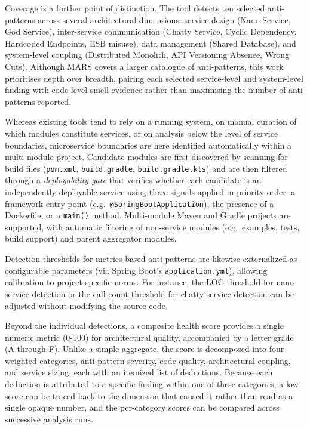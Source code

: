 Coverage is a further point of distinction. The tool detects ten selected anti-patterns across several architectural dimensions: service design (Nano Service, God Service), inter-service communication (Chatty Service, Cyclic Dependency, Hardcoded Endpoints, ESB misuse), data management (Shared Database), and system-level coupling (Distributed Monolith, API Versioning Absence, Wrong Cuts). Although MARS covers a larger catalogue of anti-patterns, this work prioritises depth over breadth, pairing each selected service-level and system-level finding with code-level smell evidence rather than maximising the number of anti-patterns reported.

Whereas existing tools tend to rely on a running system, on manual curation of which modules constitute services, or on analysis below the level of service boundaries, microservice boundaries are here identified automatically within a multi-module project. Candidate modules are first discovered by scanning for build files (\texttt{pom.xml}, \texttt{build.gradle}, \texttt{build.gradle.kts}) and are then filtered through a \textit{deployability gate} that verifies whether each candidate is an independently deployable service using three signals applied in priority order: a framework entry point (e.g.\ \texttt{@SpringBootApplication}), the presence of a Dockerfile, or a \texttt{main()} method. Multi-module Maven and Gradle projects are supported, with automatic filtering of non-service modules (e.g.\ examples, tests, build support) and parent aggregator modules.

Detection thresholds for metrics-based anti-patterns are likewise externalized as configurable parameters (via Spring Boot's \texttt{application.yml}), allowing calibration to project-specific norms. For instance, the LOC threshold for nano service detection or the call count threshold for chatty service detection can be adjusted without modifying the source code.

Beyond the individual detections, a composite health score provides a single numeric metric (0-100) for architectural quality, accompanied by a letter grade (A through F). Unlike a simple aggregate, the score is decomposed into four weighted categories, anti-pattern severity, code quality, architectural coupling, and service sizing, each with an itemized list of deductions. Because each deduction is attributed to a specific finding within one of these categories, a low score can be traced back to the dimension that caused it rather than read as a single opaque number, and the per-category scores can be compared across successive analysis runs.

